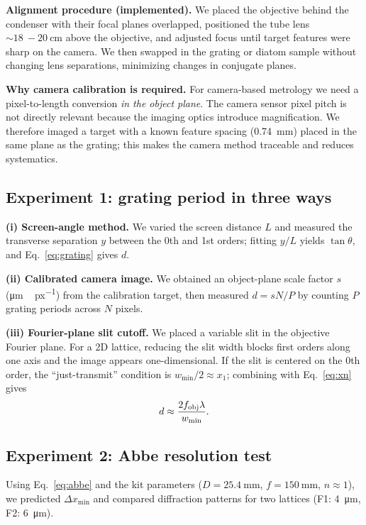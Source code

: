 \documentclass[10pt,twocolumn]{article}
\begin{document}
\textbf{Alignment procedure (implemented).} We placed the objective behind the condenser with their focal planes overlapped, positioned the tube lens $\sim\SI{18}{-}\SI{20}{\centi\meter}$ above the objective, and adjusted focus until target features were sharp on the camera. We then swapped in the grating or diatom sample without changing lens separations, minimizing changes in conjugate planes.

\textbf{Why camera calibration is required.} For camera-based metrology we need a pixel-to-length conversion \emph{in the object plane}. The camera sensor pixel pitch is not directly relevant because the imaging optics introduce magnification. We therefore imaged a target with a known feature spacing (\SI{0.74}{\milli\meter}) placed in the same plane as the grating; this makes the camera method traceable and reduces systematics.

\subsection{Experiment 1: grating period in three ways}
\textbf{(i) Screen-angle method.} We varied the screen distance $L$ and measured the transverse separation $y$ between the 0th and 1st orders; fitting $y/L$ yields $\tan\theta$, and Eq.~\eqref{eq:grating} gives $d$.

\textbf{(ii) Calibrated camera image.} We obtained an object-plane scale factor $s$ (\si{\micro\meter\,px^{-1}}) from the calibration target, then measured $d=sN/P$ by counting $P$ grating periods across $N$ pixels.

\textbf{(iii) Fourier-plane slit cutoff.} We placed a variable slit in the objective Fourier plane. For a 2D lattice, reducing the slit width blocks first orders along one axis and the image appears one-dimensional. If the slit is centered on the 0th order, the ``just-transmit'' condition is $w_{\min}/2\approx x_1$; combining with Eq.~\eqref{eq:xn} gives
\begin{equation}
 d\approx \frac{2f_{\rm obj}\lambda}{w_{\min}}.
 \label{eq:slit}
\end{equation}

\subsection{Experiment 2: Abbe resolution test}
Using Eq.~\eqref{eq:abbe} and the kit parameters ($D=\SI{25.4}{\milli\meter}$, $f=\SI{150}{\milli\meter}$, $n\approx1$), we predicted $\Delta x_{\min}$ and compared diffraction patterns for two lattices (F1: \SI{4}{\micro\meter}, F2: \SI{6}{\micro\meter}).
\end{document}
